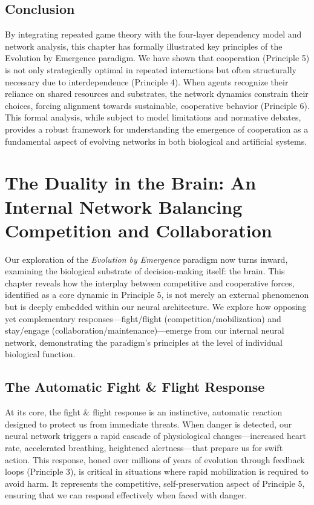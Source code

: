 \documentclass[12pt,openany]{book}
\let\cleardoublepage\clearpage %
\begin{document}
\section{Conclusion}
By integrating repeated game theory with the four-layer dependency model and network analysis, this chapter has formally illustrated key principles of the Evolution by Emergence paradigm. We have shown that cooperation (Principle 5) is not only strategically optimal in repeated interactions but often structurally necessary due to interdependence (Principle 4). When agents recognize their reliance on shared resources and substrates, the network dynamics constrain their choices, forcing alignment towards sustainable, cooperative behavior (Principle 6). This formal analysis, while subject to model limitations and normative debates, provides a robust framework for understanding the emergence of cooperation as a fundamental aspect of evolving networks in both biological and artificial systems. %
\cleardoublepage

\chapter{The Duality in the Brain: An Internal Network Balancing Competition and Collaboration} %
\label{ch:BrainDuality}

Our exploration of the \emph{Evolution by Emergence} paradigm now turns inward, examining the biological substrate of decision-making itself: the brain. This chapter reveals how the interplay between competitive and cooperative forces, identified as a core dynamic in Principle 5, is not merely an external phenomenon but is deeply embedded within our neural architecture. We explore how opposing yet complementary responses—fight/flight (competition/mobilization) and stay/engage (collaboration/maintenance)—emerge from our internal neural network, demonstrating the paradigm's principles at the level of individual biological function. %

\section{The Automatic Fight \& Flight Response}
At its core, the fight \& flight response is an instinctive, automatic reaction designed to protect us from immediate threats. When danger is detected, our neural network triggers a rapid cascade of physiological changes—increased heart rate, accelerated breathing, heightened alertness—that prepare us for swift action. This response, honed over millions of years of evolution through feedback loops (Principle 3), is critical in situations where rapid mobilization is required to avoid harm. It represents the competitive, self-preservation aspect of Principle 5, ensuring that we can respond effectively when faced with danger.
\end{document}
